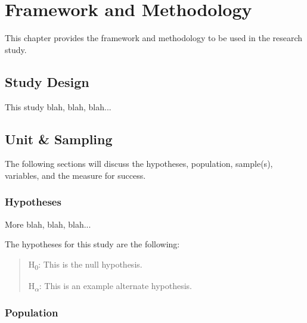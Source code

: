 %
%
%

\chapter{Framework and Methodology}

This chapter provides the framework and methodology to be used in the research study.

\section{Study Design}

This study blah, blah, blah...


\section{Unit \& Sampling}

The following sections will discuss the hypotheses, population, sample(s), variables, and the measure for success.

\subsection{Hypotheses}

More blah, blah, blah...

The hypotheses for this study are the following:

\begin{quote}
H\textsubscript{0}: This is the null hypothesis.

H\textsubscript{$\alpha$}: This is an example alternate hypothesis.
\end{quote}


\subsection{Population}

